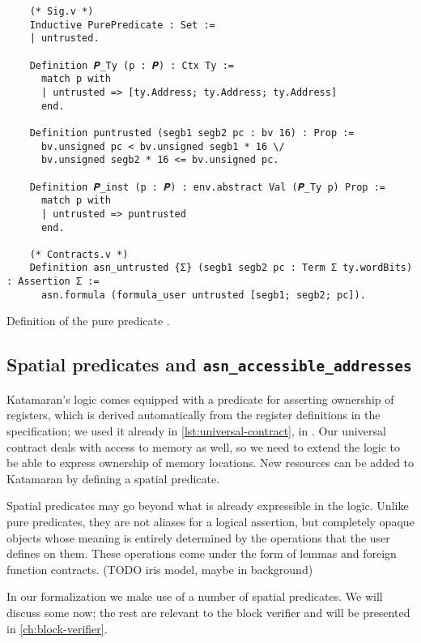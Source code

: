 \begin{listing}
  \begin{verbatim}
    (* Sig.v *)
    Inductive PurePredicate : Set :=
    | untrusted.

    Definition 𝑷_Ty (p : 𝑷) : Ctx Ty :=
      match p with
      | untrusted => [ty.Address; ty.Address; ty.Address]
      end.

    Definition puntrusted (segb1 segb2 pc : bv 16) : Prop :=
      bv.unsigned pc < bv.unsigned segb1 * 16 \/
      bv.unsigned segb2 * 16 <= bv.unsigned pc.

    Definition 𝑷_inst (p : 𝑷) : env.abstract Val (𝑷_Ty p) Prop :=
      match p with
      | untrusted => puntrusted
      end.

    (* Contracts.v *)
    Definition asn_untrusted {Σ} (segb1 segb2 pc : Term Σ ty.wordBits) : Assertion Σ :=
      asn.formula (formula_user untrusted [segb1; segb2; pc]).
  \end{verbatim}
  \caption{Definition of the pure predicate .}
  \label{lst:pure-untrusted}
\end{listing}

\subsection{Spatial predicates and \texttt{asn\_accessible\_addresses}}
\label{sec:spatial-preds}

Katamaran's logic comes equipped with a predicate for asserting ownership of registers, which is derived automatically from the register definitions in the \usail specification; we used it already in \cref{lst:universal-contract}, \eg in . Our universal contract deals with access to memory as well, so we need to extend the logic to be able to express ownership of memory locations. New resources can be added to Katamaran by defining a spatial predicate.

Spatial predicates may go beyond what is already expressible in the logic. Unlike pure predicates, they are not aliases for a logical assertion, but completely opaque objects whose meaning is entirely determined by the operations that the user defines on them. These operations come under the form of lemmas and foreign function contracts. (TODO iris model, maybe in background)

In our formalization we make use of a number of spatial predicates. We will discuss some now; the rest are relevant to the block verifier and will be presented in \cref{ch:block-verifier}.

